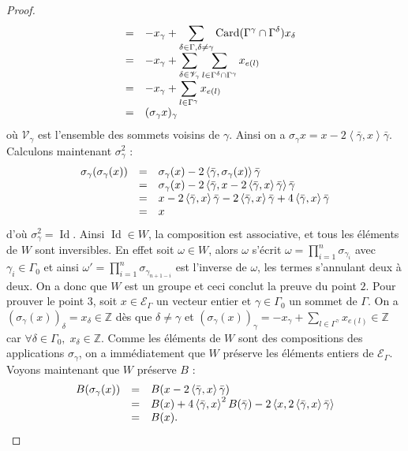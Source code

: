 \documentclass[a4paper,10pt]{article}
\DeclareMathOperator{\Id}{Id}
\DeclareMathOperator{\Card}{Card}
\newcommand{\ps}[2]{\left\langle#1,#2\right\rangle}
\newcommand{\EG}{\mathscr{E}_\Gamma}
\newcommand{\dps}{\displaystyle}
\begin{document}
\begin{proof}
\[\begin{array}{>{\dps}r>{\dps}l>{\dps}l}
			&=& -x_\gamma+\sum_{\delta\in\Gamma,\delta\neq\gamma}\Card(\Gamma^\gamma\cap\Gamma^\delta) x_\delta\\
			&=& -x_\gamma+\sum_{\delta\in \mathscr V_\gamma}\sum_{l\in\Gamma^\delta\cap\Gamma^\gamma}x_{e(l)}\\
			&=& -x_\gamma+\sum_{l\in\Gamma^\gamma}x_{e(l)}\\
			&=& (\sigma_\gamma x)_\gamma
		\end{array}
			\]
			où $\mathscr V_\gamma$ est l'ensemble des sommets voisins de $\gamma$. Ainsi on a $\sigma_\gamma x=x-2\ps{\bar\gamma}{x}\bar\gamma$. Calculons maintenant $\sigma_\gamma^2$ :
			\[
		\begin{array}{>{\dps}r>{\dps}l>{\dps}l}
			\sigma_\gamma(\sigma_\gamma(x))&=& \sigma_\gamma(x)-2\ps{\bar\gamma}{\sigma_\gamma(x)}\bar\gamma\\
			&=& \sigma_\gamma(x)-2\ps{\bar\gamma}{x-2\ps{\bar\gamma}{x}\bar\gamma}\bar\gamma\\
			&=& x-2\ps{\bar\gamma}{x}\bar\gamma-2\ps{\bar\gamma}{x}\bar\gamma+4\ps{\bar\gamma}{x}\bar\gamma\\
			&=& x\\
		\end{array}
			\]
			d'où $\sigma_\gamma^2=\Id$. Ainsi $\Id\in W$, la composition est associative, et tous les éléments de $W$ sont inversibles. En effet soit $\omega\in W$, alors $\omega$ s'écrit $\omega=\prod_{i=1}^n \sigma_{\gamma_i}$ avec $\gamma_i\in\Gamma_0$ et ainsi $\omega'=\prod_{i=1}^n \sigma_{\gamma_{n+1-i}}$ est l'inverse de $\omega$, les termes s'annulant deux à deux. On a donc que $W$ est un groupe et ceci conclut la preuve du point $2$. Pour prouver le point $3$, soit $x\in\EG$ un vecteur entier et $\gamma\in\Gamma_0$ un sommet de $\Gamma$. On a $(\sigma_\gamma(x))_\delta=x_\delta\in\mathbb Z$ dès que $\delta\neq\gamma$ et $(\sigma_\gamma(x))_\gamma=-x_\gamma+\sum_{l\in\Gamma^\gamma}x_{e(l)}\in\mathbb Z$ car $\forall \delta\in\Gamma_0,\;x_\delta\in\mathbb Z$. Comme les éléments de $W$ sont des compositions des applications $\sigma_\gamma$, on a immédiatement que $W$ préserve les éléments entiers de $\EG$. Voyons maintenant que $W$ préserve $B$ :
			\[
		\begin{array}{>{\dps}r>{\dps}l>{\dps}l}
			B(\sigma_\gamma(x))&=& B(x-2\ps{\bar\gamma}{x}\bar\gamma)\\
			&=& B(x)+4\ps{\bar\gamma}{x}^2B(\bar\gamma)-2\ps{x}{2\ps{\bar\gamma}{x}\bar\gamma}\\
			&=& B(x).
		\end{array}
\]
\end{proof}
\end{document}
